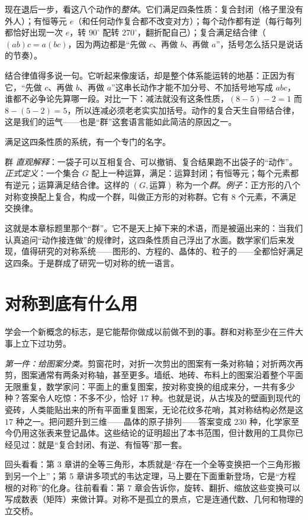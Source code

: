 现在退后一步，看这八个动作的\emph{整体}。它们满足四条性质：复合封闭（格子里没有外人）；有恒等元 $e$（和任何动作复合都不改变对方）；每个动作都有逆（每行每列都恰好出现一次 $e$，转 $90^\circ$ 配转 $270^\circ$，翻折配自己）；复合满足结合律（$(ab)c=a(bc)$，因为两边都是“先做 $c$、再做 $b$、再做 $a$”，括号怎么括只是说话的节奏）。

结合律值得多说一句。它听起来像废话，却是整个体系能运转的地基：正因为有它，“先做 $c$、再做 $b$、再做 $a$”这串长动作才能不加分号、不加括号地写成 $abc$，谁都不必争论先算哪一段。对比一下：减法就没有这条性质，$(8-5)-2=1$ 而 $8-(5-2)=5$，所以连减必须老老实实加括号。动作的复合天生自带结合律，这是我们的运气——也是“群”这套语言能如此简洁的原因之一。

满足这四条性质的系统，有一个专门的名字。

\begin{shuyu}{群}
\emph{直观解释}：一袋子可以互相复合、可以撤销、复合结果跑不出袋子的“动作”。\emph{正式定义}：一个集合 $G$ 配上一种运算，满足：运算封闭；有恒等元；每个元素都有逆元；运算满足结合律。这样的 $(G,\text{运算})$ 称为一个\emph{群}。\emph{例子}：正方形的八个对称变换配上复合，构成一个群，叫做正方形的对称群。它有 $8$ 个元素，不满足交换律。
\end{shuyu}

这就是本章标题里那个“群”。它不是天上掉下来的术语，而是被逼出来的：当我们认真追问“动作接连做”的规律时，这四条性质自己浮出了水面。数学家们后来发现，值得研究的对称系统——图形的、方程的、晶体的、粒子的——全都恰好满足这四条。于是群成了研究一切对称的统一语言。

\section{对称到底有什么用}

学会一个新概念的标志，是它能帮你做成以前做不到的事。群和对称至少在三件大事上立下过功劳。

\emph{第一件：给图案分类。}剪窗花时，对折一次剪出的图案有一条对称轴；对折两次再剪，图案通常有两条对称轴，甚至更多。墙纸、地砖、布料上的图案沿着整个平面无限重复，数学家问：平面上的重复图案，按对称变换的组成来分，一共有多少种？答案令人吃惊：不多不少，恰好 $17$ 种。也就是说，从古埃及的壁画到现代的瓷砖，人类能贴出来的所有平面重复图案，无论花纹多花哨，其对称结构必然是这 $17$ 种之一。把问题升到三维——晶体的原子排列——答案变成 $230$ 种，化学家至今仍用这张表来登记晶体。这些结论的证明超出了本书范围，但计数用的工具你已经见过：就是“复合封闭、有逆、有恒等”那一套。

\begin{lianjie}
回头看看：第 3 章讲的全等三角形，本质就是“存在一个全等变换把一个三角形搬到另一个上”；第 5 章讲多项式的韦达定理，马上要在下面重新登场，它是“方程根的对称”的化身。往前看看：第 7 章会告诉你，旋转、翻折、缩放这些变换可以写成数表（矩阵）来做计算。对称不是孤立的景点，它是连通代数、几何和物理的立交桥。
\end{lianjie}


